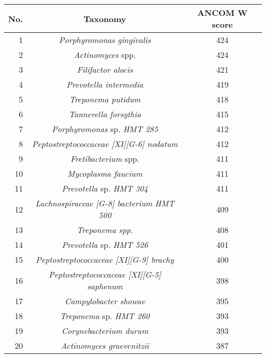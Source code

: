 \begin{tabular}{r|cc}
    \textbf{No.} & \textbf{Taxonomy} & \textbf{ANCOM W score} \\
    \hline
    1 & \textit{Porphyromonas gingivalis} & 424 \\
    2 & \textit{Actinomyces} spp. & 424 \\
    3 & \textit{Filifactor alocis} & 421 \\
    4 & \textit{Prevotella intermedia} & 419 \\
    5 & \textit{Treponema putidum} & 418 \\
    6 & \textit{Tannerella forsythia} & 415 \\
    7 & \textit{Porphyromonas} sp. \textit{HMT 285} & 412 \\
    8 & \textit{Peptostreptococcaceae [XI][G-6] nodatum} & 412 \\
    9 & \textit{Fretibacterium} spp. & 411 \\
    10 & \textit{Mycoplasma faucium} & 411 \\
    11 & \textit{Prevotella} sp. \textit{HMT 304} & 411 \\
    12 & \textit{Lachnospiraceae [G-8] bacterium HMT 500} & 409 \\
    13 & \textit{Treponema spp.} & 408 \\
    14 & \textit{Prevotella} sp. \textit{HMT 526} & 401 \\
    15 & \textit{Peptostreptococcaceae [XI][G-9]  brachy} & 400 \\
    16 & \textit{Peptostreptococcaceae [XI][G-5] saphenum} & 398 \\
    17 & \textit{Campylobacter showae} & 395 \\
    18 & \textit{Treponema} sp. \textit{HMT 260} & 393 \\
    19 & \textit{Corynebacterium durum} & 393 \\
    20 & \textit{Actinomyces graevenitzii} & 387 \\
\end{tabular}
